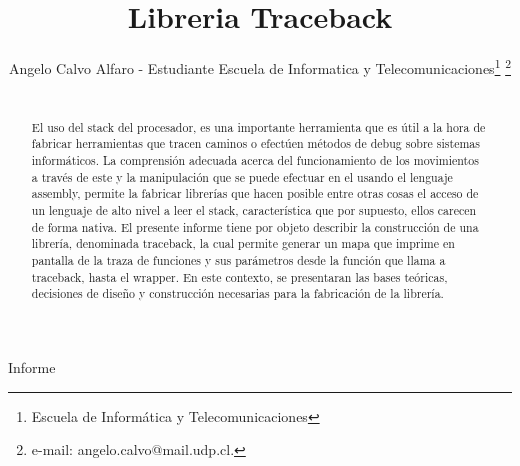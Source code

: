 \documentclass[twocolumn,11pts]{IEEEtran}
\begin{document}
\let\orilabel\label

%
\title{Libreria Traceback}
%

\author{Angelo Calvo Alfaro - Estudiante Escuela de Informatica y Telecomunicaciones\thanks{Escuela de Informática y Telecomunicaciones}%
\thanks{e-mail: angelo.calvo@mail.udp.cl.}%
}
% 
%


%
{Informe}%

\maketitle
\begin{abstract}\\
El uso del stack del procesador, es una importante herramienta que es útil a la hora de fabricar herramientas que tracen caminos o efectúen métodos de debug sobre sistemas informáticos. La comprensión adecuada acerca del funcionamiento de los movimientos a través de este y la manipulación que se puede efectuar en el usando el lenguaje assembly, permite la fabricar librerías que hacen posible entre otras cosas el acceso de un lenguaje de alto nivel a leer el stack, característica que por supuesto, ellos carecen de forma nativa. El presente informe tiene por objeto describir la construcción de una librería, denominada traceback, la cual permite generar un mapa que imprime en pantalla de la traza de funciones y sus parámetros desde la función que llama a traceback, hasta el wrapper. En este contexto, se presentaran las bases teóricas, decisiones de diseño y construcción necesarias para la fabricación de la librería.
\end{abstract}
\end{document}
